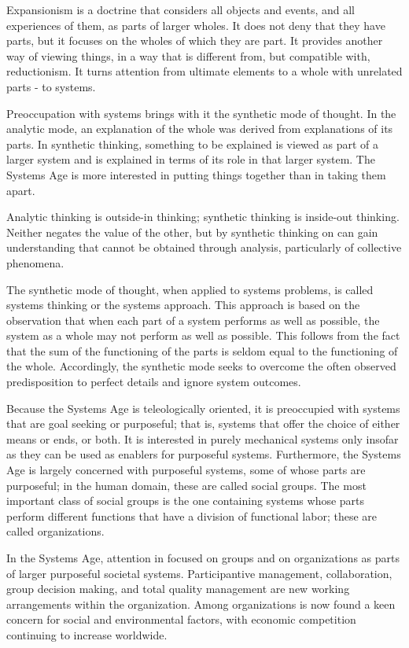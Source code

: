 Expansionism is a doctrine that considers all objects and events, and all experiences of them, as parts of larger wholes. It does not deny that they have parts, but it focuses on the wholes of which they are part. It provides another way of viewing things, in a way that is different from, but compatible with, reductionism. It turns attention from ultimate elements to a whole with unrelated parts - to systems.

Preoccupation with systems brings with it the synthetic mode of thought. In the analytic mode, an explanation of the whole was derived from explanations of its parts. In synthetic thinking, something to be explained is viewed as part of a larger system and is explained in terms of its role in that larger system. The Systems Age is more interested in putting things together than in taking them apart.

Analytic thinking is outside-in thinking; synthetic thinking is inside-out thinking. Neither negates the value of the other, but by synthetic thinking on can gain understanding that cannot be obtained through analysis, particularly of collective phenomena.

The synthetic mode of thought, when applied to systems problems, is called systems thinking or the systems approach. This approach is based on the observation that when each part of a system performs as well as possible, the system as a whole may not perform as well as possible. This follows from the fact that the sum of the functioning of the parts is seldom equal to the functioning of the whole. Accordingly, the synthetic mode seeks to overcome the often observed predisposition to perfect details and ignore system outcomes.

Because the Systems Age is teleologically oriented, it is preoccupied with systems that are goal seeking or purposeful; that is, systems that offer the choice of either means or ends, or both. It is interested in purely mechanical systems only insofar as they can be used as enablers for purposeful systems. Furthermore, the Systems Age is largely concerned with purposeful systems, some of whose parts are purposeful; in the human domain, these are called social groups. The most important class of social groups is the one containing systems whose parts perform different functions that have a division of functional labor; these are called organizations.

In the Systems Age, attention in focused on groups and on organizations as parts of larger purposeful societal systems. Participantive management, collaboration, group decision making, and total quality management are new working arrangements within the organization. Among organizations is now found a keen concern for social and environmental factors, with economic competition continuing to increase worldwide.